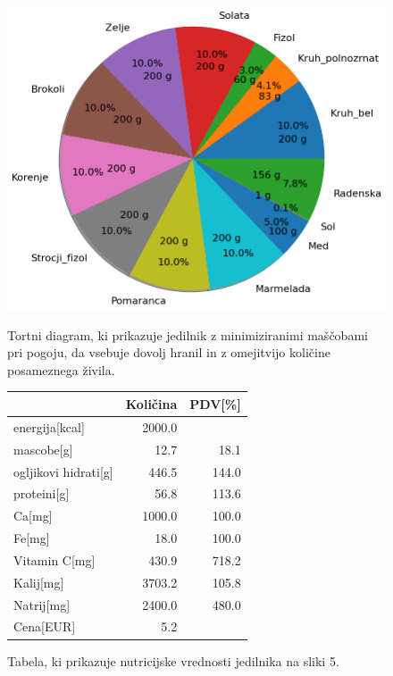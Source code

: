 \documentclass[slovene,11pt,a4paper]{article}
\begin{document}
\begin{figure}[h!]
  \centering
  \begin{minipage}[h]{0.56\textwidth}
    \includegraphics[width=\textwidth]{piechart3.png}
    \caption{Tortni diagram, ki prikazuje jedilnik z minimiziranimi maščobami pri pogoju, da 				vsebuje dovolj hranil in z omejitvijo količine posameznega živila.}
  \end{minipage}
  \hfill
  \begin{minipage}[h]{0.42\textwidth}
	\begin{tabular}{lrr}
		\toprule
		{} &  Količina &  PDV[\%] \\
		\midrule
		energija[kcal]       &    2000.0 &         \\
		mascobe[g]           &      12.7 &    18.1 \\
		ogljikovi hidrati[g] &     446.5 &   144.0 \\
		proteini[g]          &      56.8 &   113.6 \\
		Ca[mg]               &    1000.0 &   100.0 \\
		Fe[mg]               &      18.0 &   100.0 \\
		Vitamin C[mg]        &     430.9 &   718.2 \\
		Kalij[mg]            &    3703.2 &   105.8 \\
		Natrij[mg]           &    2400.0 &   480.0 \\
		Cena[EUR]            &       5.2 &         \\
		\bottomrule
	\end{tabular}
	\caption{Tabela, ki prikazuje nutricijske vrednosti jedilnika na sliki 5.}
  \end{minipage}
\end{figure}
\end{document}
